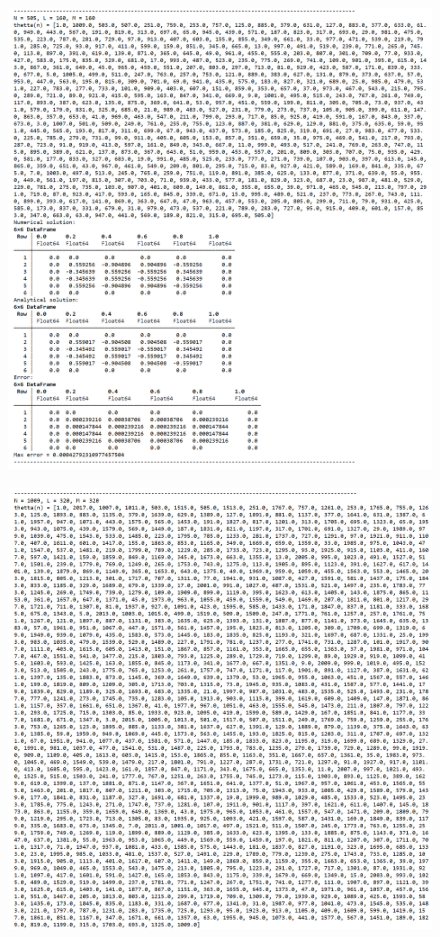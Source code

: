 \documentclass[12pt,a4paper, titlepage]{article}
\begin{document}
\begin{figure}[H]
	\centering
	\includegraphics[width = 1.0\textwidth]{lab5_5.png}
\end{figure}

\begin{figure}[H]
	\centering
	\includegraphics[width = 1.0\textwidth]{lab5_6_1.png}
\end{figure}
\end{document}
